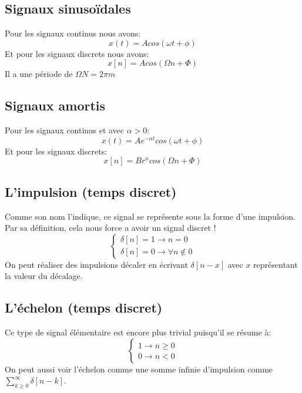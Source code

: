 \documentclass{report}
\begin{document}
\subsection{Signaux sinusoïdales}
Pour les signaux continus nous avons:
\begin{equation}
x(t) = A cos(\omega t + \phi)
\end{equation}
Et pour les signaux discrets nous avons:
\begin{equation}
x[n] = A cos(\Omega n + \Phi)
\end{equation}
Il a une période de $\Omega N = 2 \pi m$

\subsection{Signaux amortis}
Pour les signaux continus et avec $\alpha > 0$:
\begin{equation}
x(t) = A e^{-\alpha t}cos(\omega t + \phi)
\end{equation}
Et pour les signaux discrets:
\begin{equation}
x[n] = Br^ncos(\Omega n + \Phi)
\end{equation}

\subsection{L'impulsion (temps discret)}
Comme son nom l'indique, ce signal se représente sous la forme d'une impulsion. Par sa définition, cela nous force a avoir un signal discret !
\begin{equation}
\begin{cases}
\delta [n] = 1 \rightarrow n = 0 \\
\delta [n] = 0 \rightarrow \forall n \notin 0
\end{cases}
\end{equation}
On peut réaliser des impulsions décaler en écrivant $\delta [n-x]$ avec $x$ représentant la valeur du décalage.

\subsection{L'échelon (temps discret)}
Ce type de signal élémentaire est encore plus trivial puisqu'il se résume à:
\begin{equation}\label{eq:1}
\begin{cases}
1 \rightarrow n \geq 0 \\
0 \rightarrow n < 0
\end{cases}
\end{equation}
On peut aussi voir l'échelon comme une somme infinie d'impulsion comme $\sum_{k \geq 0}^{\infty} \delta[n-k]$.
\end{document}
